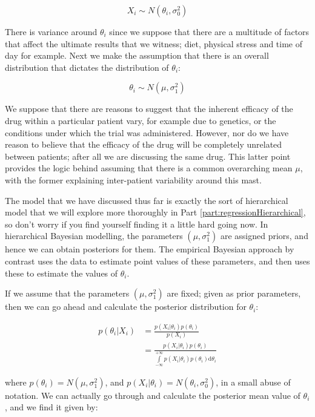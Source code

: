 \documentclass[11pt,fullpage]{book}
\begin{document}
\begin{equation}
X_i \sim N(\theta_i,\sigma_0^2)
\end{equation} 

There is variance around $\theta_i$ since we suppose that there are a multitude of factors that affect the ultimate results that we witness; diet, physical stress and time of day for example. Next we make the assumption that there is an overall distribution that dictates the distribution of $\theta_i$:

\begin{equation}
\theta_i \sim N(\mu,\sigma_1^2)
\end{equation}

We suppose that there are reasons to suggest that the inherent efficacy of the drug within a particular patient vary, for example due to genetics, or the conditions under which the trial was administered. However, nor do we have reason to believe that the efficacy of the drug will be completely unrelated between patients; after all we are discussing the same drug. This latter point provides the logic behind assuming that there is a common overarching mean $\mu$, with the former explaining inter-patient variability around this mast. 

The model that we have discussed thus far is exactly the sort of hierarchical model that we will explore more thoroughly in Part \ref{part:regressionHierarchical}, so don't worry if you find yourself finding it a little hard going now. In hierarchical Bayesian modelling, the parameters $(\mu,\sigma_1^2)$ are assigned priors, and hence we can obtain posteriors for them. The empirical Bayesian approach by contrast uses the data to estimate point values of these parameters, and then uses these to estimate the values of $\theta_i$. 

If we assume that the parameters $(\mu,\sigma_1^2)$ are fixed; given as prior parameters, then we can go ahead and calculate the posterior distribution for $\theta_i$:

\begin{align}\label{eq:Objective_empiricalBayes}
p(\theta_i|X_i) &= \frac{p(X_i|\theta_i) p(\theta_i)}{p(X_i)}\\
&= \frac{p(X_i|\theta_i) p(\theta_i)}{\int\limits_{-\infty}^{+\infty}p(X_i|\theta_i) p(\theta_i)\mathrm{d}\theta_i}
\end{align}

where $p(\theta_i)=N(\mu,\sigma_1^2)$, and $p(X_i|\theta_i)=N(\theta_i,\sigma_0^2)$, in a small abuse of notation. We can actually go through and calculate the posterior mean value of $\theta_i$, and we find it given by:
\end{document}
